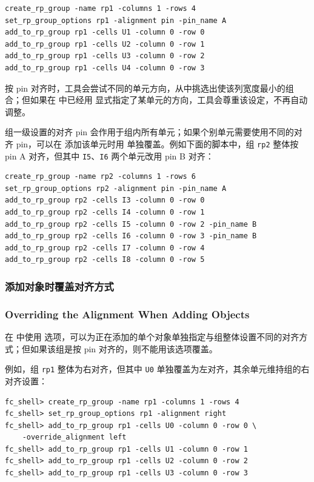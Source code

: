 \begin{lstlisting}
create_rp_group -name rp1 -columns 1 -rows 4
set_rp_group_options rp1 -alignment pin -pin_name A
add_to_rp_group rp1 -cells U1 -column 0 -row 0
add_to_rp_group rp1 -cells U2 -column 0 -row 1
add_to_rp_group rp1 -cells U3 -column 0 -row 2
add_to_rp_group rp1 -cells U4 -column 0 -row 3
\end{lstlisting}

按 pin 对齐时，工具会尝试不同的单元方向，从中挑选出使该列宽度最小的组合；但如果在  中已经用  显式指定了某单元的方向，工具会尊重该设定，不再自动调整。

组一级设置的对齐 pin 会作用于组内所有单元；如果个别单元需要使用不同的对齐 pin，可以在  添加该单元时用  单独覆盖。例如下面的脚本中，组 \texttt{rp2} 整体按 pin A 对齐，但其中 \texttt{I5}、\texttt{I6} 两个单元改用 pin B 对齐：
\begin{lstlisting}
create_rp_group -name rp2 -columns 1 -rows 6
set_rp_group_options rp2 -alignment pin -pin_name A
add_to_rp_group rp2 -cells I3 -column 0 -row 0
add_to_rp_group rp2 -cells I4 -column 0 -row 1
add_to_rp_group rp2 -cells I5 -column 0 -row 2 -pin_name B
add_to_rp_group rp2 -cells I6 -column 0 -row 3 -pin_name B
add_to_rp_group rp2 -cells I7 -column 0 -row 4
add_to_rp_group rp2 -cells I8 -column 0 -row 5
\end{lstlisting}

\subsubsection{添加对象时覆盖对齐方式}
\subsubsection*{Overriding the Alignment When Adding Objects}

在  中使用  选项，可以为正在添加的单个对象单独指定与组整体设置不同的对齐方式；但如果该组是按 pin 对齐的，则不能用该选项覆盖。

例如，组 \texttt{rp1} 整体为右对齐，但其中 \texttt{U0} 单独覆盖为左对齐，其余单元维持组的右对齐设置：
\begin{lstlisting}
fc_shell> create_rp_group -name rp1 -columns 1 -rows 4
fc_shell> set_rp_group_options rp1 -alignment right
fc_shell> add_to_rp_group rp1 -cells U0 -column 0 -row 0 \
    -override_alignment left
fc_shell> add_to_rp_group rp1 -cells U1 -column 0 -row 1
fc_shell> add_to_rp_group rp1 -cells U2 -column 0 -row 2
fc_shell> add_to_rp_group rp1 -cells U3 -column 0 -row 3
\end{lstlisting}

